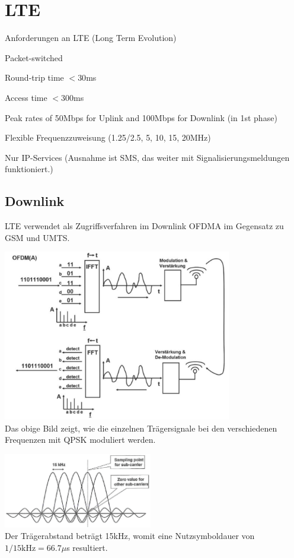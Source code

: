 \section{LTE }
    Anforderungen an LTE (Long Term Evolution)
	\begin{liste}
        \item Packet-switched
        \item Round-trip time $< 30$ms
        \item Access time $< 300$ms
        \item Peak rates of 50Mbps for Uplink and 100Mbps for Downlink (in 1st phase)
        \item Flexible Frequenzzuweisung (1.25/2.5, 5, 10, 15, 20MHz)
		\item Nur IP-Services (Ausnahme ist SMS, das weiter mit Signalisierungsmeldungen funktioniert.)
    \end{liste}

\subsection{Downlink}
	LTE verwendet als Zugriffsverfahren im Downlink OFDMA im Gegensatz zu GSM und UMTS.

	\begin{minipage}{10cm}        
        \includegraphics[width=10cm]{./bilder/systems-lte-ofdma.png} \\
        Das obige Bild zeigt, wie die einzelnen Trägersignale bei den verschiedenen Frequenzen mit QPSK moduliert werden.
    \end{minipage}
	\begin{minipage}{0.5cm}        
        \quad
    \end{minipage}
    \begin{minipage}{6.5cm}
		\includegraphics[width=6.5cm]{./bilder/systems-lte-qpsk.png} \\
		Der Trägerabstand beträgt 15kHz, womit eine Nutzsymboldauer von $1/15\text{kHz}=66.7\mu$s resultiert.
	\end{minipage}
	
	
	
